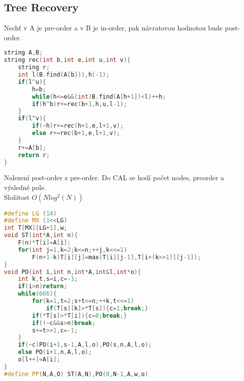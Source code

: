 \documentclass[11pt]{article}
\begin{document}
\subsection{Tree Recovery}
Nechť v \textsf{A} je pre-order a v \textsf{B} je in-order, pak návratovou hodnotou bude post-order.
\begin{lstlisting}[language=C++]
string A,B;
string rec(int b,int e,int u,int v){
    string r;
    int l(B.find(A[b])),h(-1);
    if(l^u){
        h=b;
        while(h<=e&&(int)B.find(A[h+1])<l)++h;
        if(h^b)r+=rec(b+1,h,u,l-1);
    }
    if(l^v){
        if(~h)r+=rec(h+1,e,l+1,v);
        else r+=rec(b+1,e,l+1,v);
    }
    r+=A[b];
    return r;
}
\end{lstlisting}
Nalezení post-order z pre-order. Do \textsf{CAL} se hodí počet nodes, preorder a výsledné pole.
\\Složitost $O(Nlog^2(N))$
\begin{lstlisting}[language=C++]
#define LG (14)
#define MX (1<<LG)
int T[MX][LG+1],w;
void ST(int*A,int n){
    F(n)*T[i]=A[i];
    for(int j=1,k=2;k<=n;++j,k<<=1)
        F(n+1-k)T[i][j]=max(T[i][j-1],T[i+(k>>1)][j-1]);
}
void PO(int i,int n,int*A,int&l,int*o){
    int k,t,s=i,c=-1;
    if(i>n)return;
    while(666){
        for(k=1,t=2;s+t<=n;++k,t<<=1)
            if(T[s][k]>*T[s]){c=1;break;}
        if(*T[s]>*T[i]){c=0;break;}
        if(!~c&&s>n)break;
        s+=t>>1,c=-1;
    }
    if(~c)PO(i+1,s-1,A,l,o),PO(s,n,A,l,o);
    else PO(i+1,n,A,l,o);
    o[l++]=A[i];
}
#define PP(N,A,O) ST(A,N),PO(0,N-1,A,w,o)
\end{lstlisting}
\end{document}
